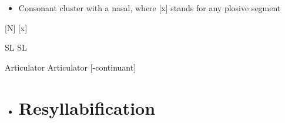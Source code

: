 \begin{itemize}
\item \begin{styleindexi}
  \label{bkm:Ref359823617}Consonant cluster with a nasal, where [x] stands for any plosive segment
\end{styleindexi}\end{itemize}

[N]              [x]


\begin{styleindexi}

\end{styleindexi}

\begin{styleindexi}
                     SL                                                 SL
\end{styleindexi}

\begin{styleindexi}
                                                                   
\end{styleindexi}

\begin{styleindexi}
  [nasal]          Articulator                                  Articulator          [-continuant]
\end{styleindexi}

\begin{styleindexi}
      
\end{styleindexi}

\begin{styleindexi}
                                                                        [α]
\end{styleindexi}

\begin{itemize}
\item \section{ Resyllabification}\end{itemize}

